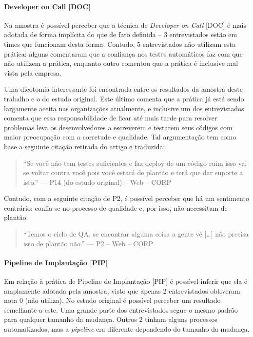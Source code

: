 \paragraph*{Developer on Call [DOC]}

Na amostra é possível perceber que a técnica de \emph{Developer on Call} [DOC] \cite{devAndDeploymentFB} é mais adotada de forma implícita do que de fato definida -- 3 entrevistados estão em times que funcionam desta forma. Contudo, 5 entrevistados não utilizam esta prática: alguns comentaram que a confiança nos testes automáticos faz com que não utilizem a prática, enquanto outro comentou que a prática é inclusive mal vista pela empresa.

Uma dicotomia interessante foi encontrada entre os resultados da amostra deste trabalho e o do estudo original. Este último comenta que a prática já está sendo largamente aceita nas organizações atualmente, e inclusive um dos entrevistados comenta que essa responsabilidade de ficar até mais tarde para resolver problemas leva os desenvolvedores a escreverem e testarem seus códigos com maior preocupação com a corretude e qualidade. Tal argumentação tem como base a seguinte citação retirada do artigo e traduzida:

\begin{quote}
    ``Se você não tem testes suficientes e faz deploy de um código ruim isso vai se voltar contra você pois você estará de plantão e terá que dar suporte a isto.'' --- P14 (do estudo original) -- Web -- CORP
\end{quote}


Contudo, com a seguinte citação de P2, é possível perceber que há um sentimento contrário: confia-se no processo de qualidade e, por isso, não necessitam de plantão.


\begin{quote}
    ``Temos o ciclo de QA, se encontrar alguma coisa a gente vê […] não precisa isso de plantão não.'' --- P2 -- Web -- CORP
\end{quote}

\paragraph*{Pipeline de Implantação [PIP]}

Em relação à prática de Pipeline de Implantação [PIP] \cite{devopsBook} é possível inferir que ela é amplamente adotada pela amostra, visto que apenas 2 entrevistados obtiveram nota 0 (não utiliza). No estudo original é possível perceber um resultado semelhante a este. Uma grande parte dos entrevistados segue o mesmo padrão para qualquer tamanho da mudança. Outros 2 tinham alguns processos automatizados, mas a \emph{pipeline} era diferente dependendo do tamanho da mudança.

